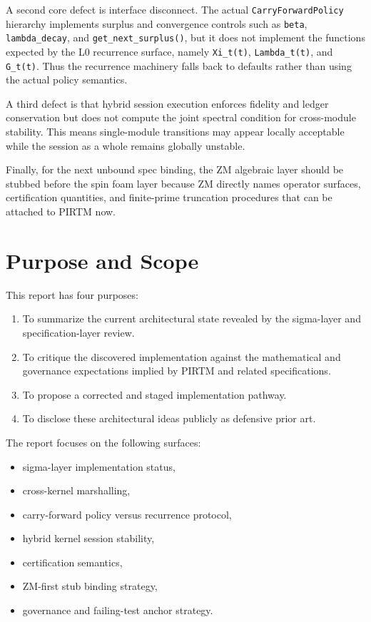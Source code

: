 \documentclass[11pt]{article}
\begin{document}
A second core defect is interface disconnect. The actual \texttt{CarryForwardPolicy} hierarchy implements surplus and convergence controls such as \texttt{beta}, \texttt{lambda\_decay}, and \texttt{get\_next\_surplus()}, but it does not implement the functions expected by the L0 recurrence surface, namely \texttt{Xi\_t(t)}, \texttt{Lambda\_t(t)}, and \texttt{G\_t(t)}. Thus the recurrence machinery falls back to defaults rather than using the actual policy semantics.

A third defect is that hybrid session execution enforces fidelity and ledger conservation but does not compute the joint spectral condition for cross-module stability. This means single-module transitions may appear locally acceptable while the session as a whole remains globally unstable.

Finally, for the next unbound spec binding, the ZM algebraic layer should be stubbed before the spin foam layer because ZM directly names operator surfaces, certification quantities, and finite-prime truncation procedures that can be attached to PIRTM now.

\section{Purpose and Scope}

This report has four purposes:

\begin{enumerate}[label=\arabic*.]
\item To summarize the current architectural state revealed by the sigma-layer and specification-layer review.
\item To critique the discovered implementation against the mathematical and governance expectations implied by PIRTM and related specifications.
\item To propose a corrected and staged implementation pathway.
\item To disclose these architectural ideas publicly as defensive prior art.
\end{enumerate}

The report focuses on the following surfaces:

\begin{itemize}
\item sigma-layer implementation status,
\item cross-kernel marshalling,
\item carry-forward policy versus recurrence protocol,
\item hybrid kernel session stability,
\item certification semantics,
\item ZM-first stub binding strategy,
\item governance and failing-test anchor strategy.
\end{itemize}
\end{document}
